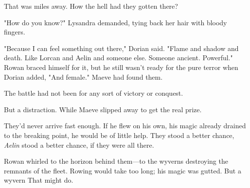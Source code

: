 That was miles away. How the hell had they gotten there?

"How do you know?" Lysandra demanded, tying back her hair with bloody fingers.

"Because I can feel something out there," Dorian said. "Flame and shadow and death. Like Lorcan and Aelin and someone else. Someone ancient. Powerful." Rowan braced himself for it, but he still wasn't ready for the pure terror when Dorian added, "And female." Maeve had found them.

The battle had not been for any sort of victory or conquest.

But a distraction. While Maeve slipped away to get the real prize.

They'd never arrive fast enough. If he flew on his own, his magic already drained to the breaking point, he would be of little help. They stood a better chance, \emph{Aelin} stood a better chance, if they were all there.

Rowan whirled to the horizon behind them---to the wyverns destroying the remnants of the fleet. Rowing would take too long; his magic was gutted. But a wyvern  That might do.
